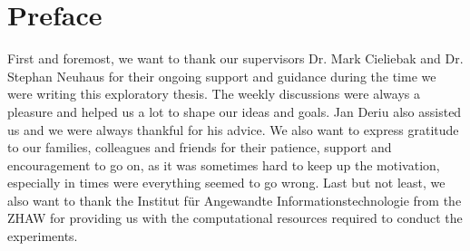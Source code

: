 \chapter*{Preface}
First and foremost, we want to thank our supervisors Dr. Mark Cieliebak and Dr. Stephan Neuhaus for their ongoing support and guidance during the time we were writing this exploratory thesis. The weekly discussions were always a pleasure and helped us a lot to shape our ideas and goals. Jan Deriu also assisted us and we were always thankful for his advice. We also want to express gratitude to our families, colleagues and friends for their patience, support and encouragement to go on, as it was sometimes hard to keep up the motivation, especially in times were everything seemed to go wrong. Last but not least, we also want to thank the Institut für Angewandte Informationstechnologie from the ZHAW for providing us with the computational resources required to conduct the experiments.
